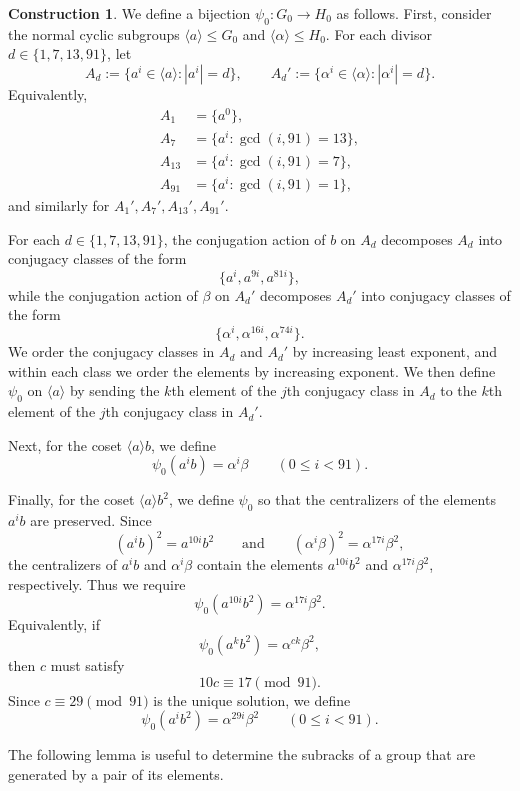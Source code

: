 \documentclass[a4paper,12pt]{article}
\theoremstyle{definition}
\newtheorem*{construction}{Construction}
\theoremstyle{remark}
\begin{document}
\begin{construction}
  We define a bijection $\psi_0\colon G_0\to H_0$ as follows. First, consider the normal cyclic subgroups $\langle a\rangle\leq G_0$ and $\langle \alpha\rangle\leq H_0$. For each divisor $d\in\{1,7,13,91\}$, let
  $$ A_d:=\{a^i\in \langle a\rangle : |a^i|=d\}, \qquad A_d':=\{\alpha^i\in \langle \alpha\rangle : |\alpha^i|=d\}. $$
  Equivalently,
  \begin{align*}
    A_1 &= \{a^0\},\\
    A_7 &= \{a^i : \gcd(i,91)=13\},\\
    A_{13} &= \{a^i : \gcd(i,91)=7\},\\
    A_{91} &= \{a^i : \gcd(i,91)=1\},
  \end{align*}
  and similarly for $A_1',A_7',A_{13}',A_{91}'$.

  For each $d\in\{1,7,13,91\}$, the conjugation action of $b$ on $A_d$ decomposes $A_d$ into conjugacy classes of the form
  $$ \{a^i,a^{9i},a^{81i}\}, $$
  while the conjugation action of $\beta$ on $A_d'$ decomposes $A_d'$ into conjugacy classes of the form
  $$ \{\alpha^i,\alpha^{16i},\alpha^{74i}\}. $$
  We order the conjugacy classes in $A_d$ and $A_d'$ by increasing least exponent, and within each class we order the elements by increasing exponent. We then define $\psi_0$ on $\langle a\rangle$ by sending the $k$th element of the $j$th conjugacy class in $A_d$ to the $k$th element of the $j$th conjugacy class in $A_d'$.

  Next, for the coset $\langle a\rangle b$, we define
  $$ \psi_0(a^i b)=\alpha^i\beta \qquad (0\leq i<91). $$

  Finally, for the coset $\langle a\rangle b^2$, we define $\psi_0$ so that the centralizers of the elements $a^ib$ are preserved. Since
  $$ (a^i b)^2=a^{10i}b^2 \qquad\text{and}\qquad (\alpha^i\beta)^2=\alpha^{17i}\beta^2, $$
  the centralizers of $a^i b$ and $\alpha^i\beta$ contain the elements $a^{10i}b^2$ and $\alpha^{17i}\beta^2$, respectively. Thus we require
  $$ \psi_0(a^{10i}b^2)=\alpha^{17i}\beta^2. $$
  Equivalently, if
  $$ \psi_0(a^k b^2)=\alpha^{ck}\beta^2, $$
  then $c$ must satisfy
  $$ 10c\equiv 17\pmod{91}. $$
  Since $c\equiv 29\pmod{91}$ is the unique solution, we define
  $$ \psi_0(a^i b^2)=\alpha^{29i}\beta^2 \qquad (0\leq i<91). $$
\end{construction}


The following lemma is useful to determine the subracks of a group that are generated by a pair of its elements.
\end{document}
